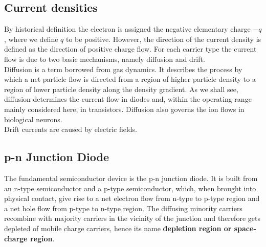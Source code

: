 \documentclass[report]{subfiles}
\begin{document}
\subsection{Current densities}
By historical definition the electron is assigned the negative elementary charge \(-q\) , where we define \(q\) to be positive. However, the direction of the current density is
defined as the direction of positive charge flow. For each carrier type the current flow is due to two basic mechanisms, namely diffusion and drift.\\
Diffusion is a term borrowed from gas dynamics. It describes the process by which a net particle flow is directed from a region of
higher particle density to a region of lower particle density along the density gradient. As we shall see, diffusion determines the current flow in diodes and, within the operating range mainly considered here, in transistors.
Diffusion also governs the ion flows in biological neurons.\\
Drift currents are caused by electric fields.

\subsection{p-n Junction Diode}
The fundamental semiconductor device is the p-n junction diode. It is built from an n-type semiconductor and a p-type semiconductor, which, when brought into physical contact, give rise to a net electron flow from n-type to p-type region and a net hole flow from p-type to n-type region. The diffusing minority carriers recombine with majority carriers in the vicinity of the junction and therefore gets depleted of mobile charge carriers, hence its name \textbf{depletion region or space-charge region}. 
\end{document}
